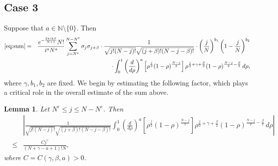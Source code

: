 \documentclass[12pt,reqno]{amsart}
\newcommand\N{\mathbb{N}}
\newcommand\ve{\varepsilon}
\theoremstyle{plain}
\newtheorem{lemma}[thm]{Lemma}
\theoremstyle{remark}
\numberwithin{equation}{section}
\begin{document}
\subsection{Case 3} 
Suppose that $a\in\N\setminus\{0\}$. Then
\begin{eqnarray*}
\eqref{eq:sum}&=&\frac{e^{-\frac{2\pi ik\beta}{N+1}}N!}{i^aN^a}\sum_{j=N^\ve}^{N-N^\ve}\sigma_j\sigma_{j+\beta}\cdot\frac{1}{\sqrt{j!(N-j)!}\sqrt{(j+\beta)!(N-j-\beta)!}}\cdot\left(\frac jN\right)^{b_1}\left(1-\frac jN\right)^{b_2}\\
&&\cdot\int_0^1\left(\frac{d}{d\rho}\right)^a\left[\rho^\frac j2(1-\rho)^{\frac{N-j}{2}}\right]\rho^{\frac j2+\gamma+\frac\beta2}(1-\rho)^{\frac{N-j}{2}-\frac\beta2}\,d\rho,
\end{eqnarray*}
where $\gamma,b_1,b_2$ are fixed. We begin by estimating the following factor, which plays a critical role in the overall estimate of the sum above.
\begin{lemma}
Let $N^\ve\le j\le N-N^\ve$. Then
\begin{eqnarray*}
&&\left|\frac{1}{\sqrt{j!(N-j)!}\sqrt{(j+\beta)!(N-j-\beta)!}}\int_0^1\left(\frac{d}{d\rho}\right)^a\left[\rho^\frac j2(1-\rho)^{\frac{N-j}{2}}\right]\rho^{\frac j2+\gamma+\frac\beta2}(1-\rho)^{\frac{N-j}{2}-\frac\beta2}\,d\rho\right|\\
&\le&\frac{Cj^\gamma}{(N+\gamma-a+1)!N},
\end{eqnarray*}
where $C=C(\gamma,\beta,a)>0$.
\end{lemma}
\end{document}
